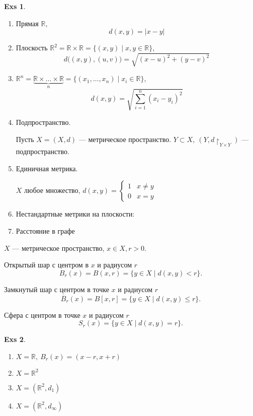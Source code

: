 \documentclass[11pt]{book}
\newcommand{\R}{\mathbb{R}}
\renewcommand{\le}{\leqslant}
\theoremstyle{definition}
\theoremstyle{plain}
\theoremstyle{plain}
\theoremstyle{definition}
\newtheorem*{exs}{Exs}
\theoremstyle{remark}
\begin{document}
\begin{exs}
    $ $
    \begin{enumerate}
	\item Прямая $ \R$,  $$ d(x, y) = |x -y|$$
	\item Плоскость $ \R^2 = \R \times \R = \{(x, y) \mid x, y \in \R\}$,  
	    \[ d \bigl((x, y), (u, v)\bigr) = \sqrt{(x-u)^2+(y-v)^2}\]
	\item $ \R^n = \underbrace{\R \times \ldots \times  \R}_n = \{(x_1, \ldots , x_n) \mid x_i\in \R\}$,  
	    \[ d (x, y) = \sqrt{\sum_{i=1}^{n} (x_i - y_i)^2}\]
	\item Подпространство.

	    Пусть  $ X = (X, d)$ ---  метрическое пространство. $ Y \subset X, ~ (Y, d\!\!\upharpoonright_{Y \times Y})$ --- подпространство.
	\item Единичная метрика.

	    $ X$ любое множество,  $ d (x, y)=
	    \begin{cases}
		1 & x  \ne y \\
		0 & x = y
	    \end{cases}$

	\item Нестандартные метрики на плоскости:
	\item Расстояние в графе
    \end{enumerate}
\end{exs}
\begin{defn}
    $ X$ ---  метрическое пространство, $ x \in X, r > 0$.

    Открытый шар с центром в  $ x$ и радиусом  $ r$
    \[
	B_r(x) = B(x, r) = \{y \in  X\mid d(x, y) < r\}
    .\]

    Замкнутый шар с центром в точке $ x$ и радиусом  $ r$
    \[
	\overline{B}_r(x) =  B[x, r] = \{y \in X \mid d(x, y) \le r\}
    .\]

    Сфера с центром в точке $ x$ и радиусом  $ r$
    \[
	S_r(x) = \{y \in  X\mid d(x, y) = r\}
    .\]
\end{defn}
\begin{exs}
    $ $
    \begin{enumerate}
	\item$ X = \R, ~ B_r(x) = (x-r, x+r)$
	\item$ X = \R^2$
	\item$ X = (\R^2, d_1)$
	\item$ X = (\R^2, d_{\infty})$
    \end{enumerate}
\end{exs}
\end{document}
